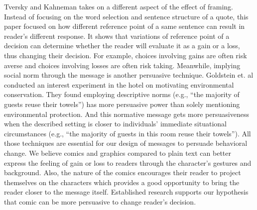 Tversky and Kahneman takes on a different aspect of the effect of framing. Instead of focusing on the word selection and sentence structure of a quote, this paper focused on how different reference point of a same sentence can result in reader's different response. It shows that variations of reference point of a decision can determine whether the reader will evaluate it as a gain or a loss, thus changing their decision. For example, choices involving gains are often risk averse and choices involving losses are often risk taking. Meanwhile, implying social norm through the message is another persuasive technique.  Goldstein et. al conducted an interest experiment in the hotel on motivating environmental conservation. They found employing descriptive norms (e.g., “the majority of guests reuse their towels”) has more persuasive power than solely mentioning environmental protection. And this normative message gets more persuasiveness when the described setting is closer to individuals' immediate situational circumstances (e.g., “the majority of guests in this room reuse their towels”).  All those techniques are essential for our design of messages to persuade behavioral change. We believe comics and graphics compared to plain text can better express the feeling of gain or loss to readers through the character's gestures and background. Also, the nature of the comics encourages their reader to project themselves on the characters which provides a good opportunity to bring the reader closer to the message itself. Established research supports our hypothesis that comic can be more persuasive to change reader's decision.

